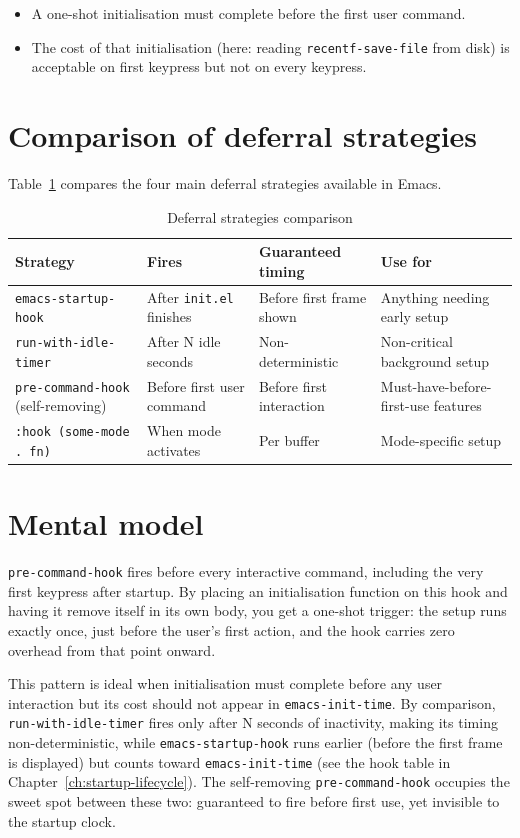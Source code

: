 \begin{itemize}
\item A one-shot initialisation must complete before the first user command.
\item The cost of that initialisation (here: reading \texttt{recentf-save-file} from disk) is acceptable on first keypress but not on every keypress.
\end{itemize}

\section{Comparison of deferral strategies}\label{comparison-of-deferral-strategies}

Table~\ref{tab:deferral-strategies} compares the four main deferral strategies available in Emacs.

\begin{table}
\centering
\caption{Deferral strategies comparison}
\label{tab:deferral-strategies}
\begin{tabularx}{\linewidth}{@{}lXlX@{}}
\toprule
Strategy & Fires & Guaranteed timing & Use for \\
\midrule
\texttt{emacs-startup-hook} & After \texttt{init.el} finishes & Before first frame shown & Anything needing early setup \\
\texttt{run-with-idle-timer} & After N idle seconds & Non-deterministic & Non-critical background setup \\
\texttt{pre-command-hook} (self-removing) & Before first user command & Before first interaction & Must-have-before-first-use features \\
\texttt{:hook (some-mode . fn)} & When mode activates & Per buffer & Mode-specific setup \\
\bottomrule
\end{tabularx}
\end{table}

\section{Mental model}
\texttt{pre-command-hook} fires before every interactive command, including the very first keypress after startup.  By placing an initialisation function on this hook and having it remove itself in its own body, you get a one-shot trigger: the setup runs exactly once, just before the user's first action, and the hook carries zero overhead from that point onward.

This pattern is ideal when initialisation must complete before any user interaction but its cost should not appear in \texttt{emacs-init-time}.  By comparison, \texttt{run-with-idle-timer} fires only after N seconds of inactivity, making its timing non-deterministic, while \texttt{emacs-startup-hook} runs earlier (before the first frame is displayed) but counts toward \texttt{emacs-init-time} (see the hook table in Chapter~\ref{ch:startup-lifecycle}).  The self-removing \texttt{pre-command-hook} occupies the sweet spot between these two: guaranteed to fire before first use, yet invisible to the startup clock.
